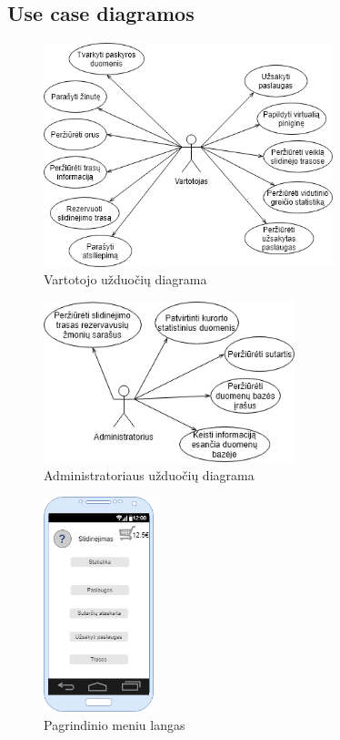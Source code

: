 \documentclass[oneside]{VUMIFPSkursinis}
\begin{document}
\subsection{Use case diagramos}
\begin{figure}[h]
    \centering
    \includegraphics[width=0.75\textwidth]{useCaseVartotojas.png}
    \caption{Vartotojo užduočių diagrama}
    \label{fig:VartotojoUseCasel}
\end{figure}
\vskip 1cm
\begin{figure}[h]
    \centering
    \includegraphics[width=0.65\textwidth]{useCaseAdministratorius.png}
    \caption{Administratoriaus užduočių diagrama}
    \label{fig:AdministratoriausUseCase}
\end{figure}

\begin{figure}[h]
    \centering
    \includegraphics[width=0.30\textwidth]{mainmenu.png}
    \caption{Pagrindinio meniu langas}
    \label{fig:mainmenu}
\end{figure}
\end{document}
